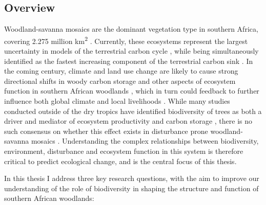 \begin{refsection}


\chapter[\chaptertitle]{\chaptertitle}
\label{ch:intro}

\clearpage{}
\section{Overview}
\label{intro:sec:overview}

Woodland-savanna mosaics are the dominant vegetation type in southern Africa, covering \textapprox{}2.275 million km\textsuperscript{2} \citep{Arino2010}. Currently, these ecosystems represent the largest uncertainty in models of the terrestrial carbon cycle \citep{Ahlstrom2015}, while being simultaneously identified as the fastest increasing component of the terrestrial carbon sink \citep{Sitch2015}. In the coming century, climate and land use change are likely to cause strong directional shifts in woody carbon storage and other aspects of ecosystem function in southern African woodlands \citep{Midgley2011, Giannecchini2007, Scholze2006}, which in turn could feedback to further influence both global climate and local livelihoods \citep{Jew2016, Kalema2015}. While many studies conducted outside of the dry tropics have identified biodiversity of trees as both a driver and mediator of ecosystem productivity and carbon storage \citep{Liang2016}, there is no such consensus on whether this effect exists in disturbance prone woodland-savanna mosaics \citep{Mensah2020, Shirima2015a, McNicol2018a, Loiola2015}. Understanding the complex relationships between biodiversity, environment, disturbance and ecosystem function in this system is therefore critical to predict ecological change, and is the central focus of this thesis.

In this thesis I address three key research questions, with the aim to improve our understanding of the role of biodiversity in shaping the structure and function of southern African woodlands:


\end{refsection}
